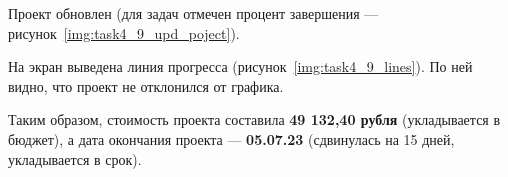 


Проект обновлен (для задач отмечен процент завершения --- рисунок~\ref{img:task4_9_upd_poject}).

На экран выведена линия прогресса (рисунок~\ref{img:task4_9_lines}). По ней видно, что проект не отклонился от графика.

Таким образом, стоимость проекта составила \textbf{49 132,40 рубля} (укладывается в бюджет), а дата окончания проекта --- \textbf{05.07.23} (сдвинулась на 15 дней, 
укладывается в срок).










